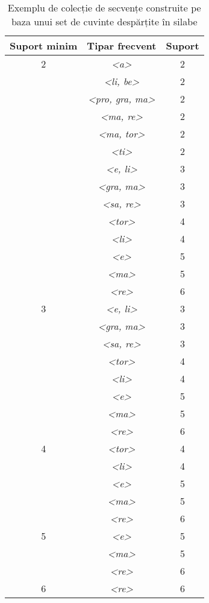 \begin{table}[h!]
\centering    
\begin{tabular}{|c|c|c|}    
\hline      
Suport minim & Tipar frecvent & Suport\\
\hline
2& \textit{<a>} & 2  \\
 & \textit{<li, be>} & 2  \\
 & \textit{<pro, gra, ma>} & 2  \\
 & \textit{<ma, re>} & 2  \\
 & \textit{<ma, tor>} & 2  \\
 & \textit{<ti>} & 2  \\
 & \textit{<e, li>} & 3  \\
 & \textit{<gra, ma>} & 3  \\
 & \textit{<sa, re>} & 3  \\
 & \textit{<tor>} & 4  \\
 & \textit{<li>} & 4  \\
 & \textit{<e>} & 5  \\
 & \textit{<ma>} & 5  \\
 & \textit{<re>} & 6  \\
\hline
3 & \textit{<e, li>} & 3  \\
 & \textit{<gra, ma>} & 3  \\
 & \textit{<sa, re>} & 3  \\
 & \textit{<tor>} & 4  \\
 & \textit{<li>} & 4  \\
 & \textit{<e>} & 5  \\
 & \textit{<ma>} & 5  \\
 & \textit{<re>} & 6  \\
\hline
4 & \textit{<tor>} & 4  \\
 & \textit{<li>} & 4  \\
 & \textit{<e>} & 5  \\
 & \textit{<ma>} & 5  \\
 & \textit{<re>} & 6  \\
\hline
5 & \textit{<e>} & 5  \\
 & \textit{<ma>} & 5  \\
 & \textit{<re>} & 6  \\
\hline
6 & \textit{<re>} & 6  \\
\hline                              
\end{tabular}
\caption{Exemplu de colecție de secvențe construite pe baza unui set de cuvinte despărțite în silabe}
\label{table:sdb_patterns}               
\end{table}

